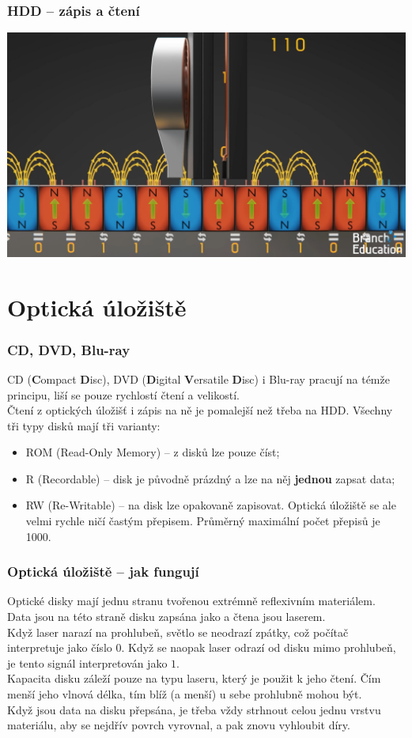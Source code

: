 \documentclass[aspectratio=169,11pt,svgnames]{beamer}
\begin{document}
\begin{frame}
 \frametitle{HDD -- zápis a čtení}
 \begin{center}
  \includegraphics[width=.8\textwidth]{hdd_reading}
 \end{center}
\end{frame}

\section{Optická úložiště}

\begin{frame}
 \frametitle{CD, DVD, Blu-ray}
 CD (\textbf{C}ompact \textbf{D}isc), DVD (\textbf{D}igital \textbf{V}ersatile
 \textbf{D}isc) i Blu-ray pracují na témže principu, liší se pouze rychlostí
 čtení a velikostí.\\
 \pause
 Čtení z optických úložišť i zápis na ně je pomalejší než třeba na HDD.
 \pause
 Všechny tři typy disků mají tři varianty:
 \begin{itemize}[label=\textbullet]
  \item ROM (Read-Only Memory) -- z disků lze pouze číst;
  \item R (Recordable) -- disk je původně prázdný a lze na něj \textbf{jednou}
   zapsat data;
  \item RW (Re-Writable) -- na disk lze opakovaně zapisovat. Optická úložiště se
   ale velmi rychle ničí častým přepisem. Průměrný maximální počet přepisů je
   1000.
 \end{itemize}
\end{frame}

\begin{frame}
 \frametitle{Optická úložiště -- jak fungují}
 Optické disky mají jednu stranu tvořenou extrémně reflexivním materiálem.\\
 \pause
 Data jsou na této straně disku zapsána jako  a čtena jsou
 laserem.\\
 \pause
 Když laser narazí na prohlubeň, světlo se neodrazí zpátky, což počítač
 interpretuje jako číslo $0$. Když se naopak laser odrazí od disku mimo
 prohlubeň, je tento signál interpretován jako $1$.\\
 \pause
 Kapacita disku záleží pouze na typu laseru, který je použit k jeho čtení. Čím
 menší jeho vlnová délka, tím blíž (a menší) u sebe prohlubně mohou být.\\
 \pause
 Když jsou data na disku přepsána, je třeba vždy strhnout celou jednu vrstvu
 materiálu, aby se nejdřív povrch vyrovnal, a pak znovu vyhloubit díry.
\end{frame}
\end{document}
